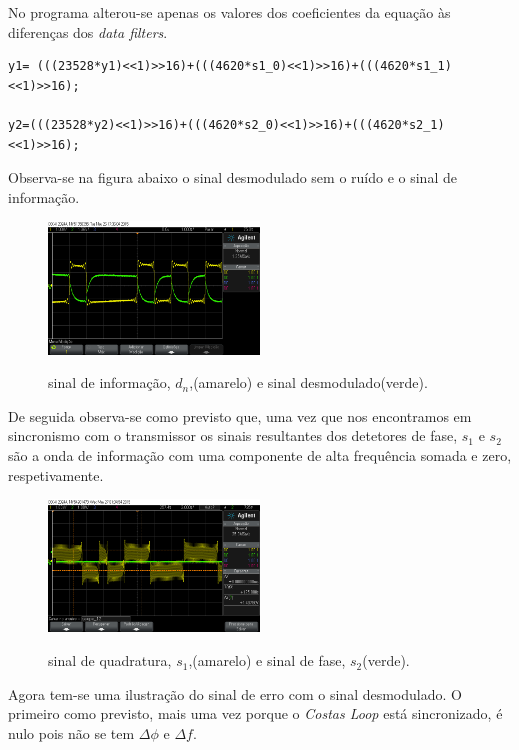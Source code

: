 \documentclass[11pt]{article}
\numberwithin{equation}{section}
\begin{document}
No programa alterou-se apenas os valores dos coeficientes da equação às diferenças dos \textit{data filters}.

\begin{lstlisting}
y1= (((23528*y1)<<1)>>16)+(((4620*s1_0)<<1)>>16)+(((4620*s1_1)<<1)>>16);

y2=(((23528*y2)<<1)>>16)+(((4620*s2_0)<<1)>>16)+(((4620*s2_1)<<1)>>16);
\end{lstlisting}
Observa-se na figura abaixo o sinal desmodulado sem o ruído e o sinal de informação.

\begin{figure}[H]
	\centering
	\includegraphics[width=0.5\textwidth]{./dn_y1}~\\
	\caption{sinal de informação, $d_n$,(amarelo) e sinal desmodulado(verde).}
	\label{demod}
\end{figure}

De seguida observa-se como previsto que, uma vez que nos encontramos em sincronismo com o transmissor os sinais resultantes dos detetores de fase, $s_1$ e $s_2$ são a onda de informação com uma componente de alta frequência somada e zero, respetivamente.

\begin{figure}[H]
	\centering
	\includegraphics[width=0.5\textwidth]{./s1_s2n}~\\
	\caption{sinal de quadratura, $s_1$,(amarelo) e sinal de fase, $s_2$(verde).}
	\label{s1_s2}
\end{figure}

Agora tem-se uma ilustração do sinal de erro com o sinal desmodulado. O primeiro como previsto, mais uma vez porque o \textit{Costas Loop} está sincronizado, é nulo pois não se tem $\Delta\phi$ e $\Delta f$.
\end{document}

